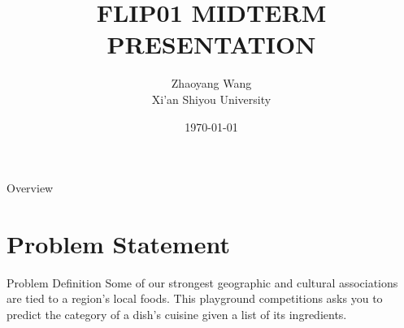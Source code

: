\documentclass[
 size=12pt,
 paper=smartboard, %
 mode=present, %
 display=slides, %
style=tuliplab,
pauseslide,
fleqn,leqno]{powerdot}
\title{FLIP01 MIDTERM PRESENTATION}
\author{
Zhaoyang Wang
\\
Xi'an Shiyou University 
}
\date{\today}
\begin{document}
\maketitle 
\begin{slide}[toc=,bm=]{Overview}
  \tableofcontents[content=sections]
\end{slide}

  \section{Problem Statement}

  \begin{slide}{Problem Definition}
 \hspace{0.5cm}  Some of our strongest geographic and cultural associations are tied to a region's local foods. 
  This playground competitions asks you to predict the category of a dish's cuisine given a list of its
  ingredients. 
  \end{slide}
\end{document}

